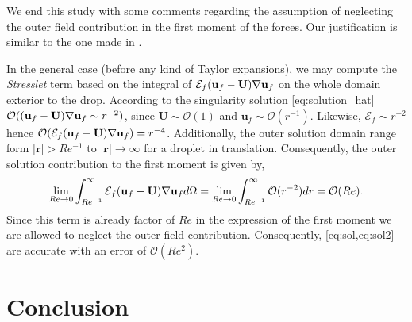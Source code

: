 We end this study with some comments regarding the assumption of neglecting the outer field contribution in the first moment of the forces.
Our justification is similar to the one made in \citet{stone2001inertial,raja2010inertial,jiang2021inertial}.  

In the general case (before any kind of Taylor expansions), we may compute the \textit{Stresslet} term based on the integral of $\mathcal{E}_f (\textbf{u}_f - \textbf{U})\mathbf{\nabla} \textbf{u}_f$ on the whole domain exterior to the drop. 
According to the singularity solution \eqref{eq:solution_hat} $\mathcal{O}((\textbf{u}_f - \textbf{U})\mathbf{\nabla} \textbf{u}_f \sim r^{-2})$, since $\textbf{U} \sim \mathcal{O}(1)$ and $\textbf{u}_f\sim \mathcal{O}(r^{-1})$. 
Likewise, $\mathcal{E}_f \sim r^{-2}$ hence $\mathcal{O}(\mathcal{E}_f (\textbf{u}_f - \textbf{U})\mathbf{\nabla} \textbf{u}_f) = r^{-4}$. 
Additionally, the outer solution domain range form $|\textbf{r}| > Re^{-1}$ to $|\textbf{r}|\to \infty$ for a droplet in translation\citet{proudman1957expansions}.
Consequently, the outer solution contribution to the first moment is given by\citep{stone2001inertial}, 
\begin{equation}
    \lim_{Re \to 0 }
    \int_{Re^{-1}}^\infty
    \mathcal{E}_f (\textbf{u}_f - \textbf{U})\mathbf{\nabla} \textbf{u}_f
    d\Omega
    =
    \lim_{Re \to 0 }
    \int_{Re^{-1}}^\infty
    \mathcal{O}(r^{-2})
    dr
    = \mathcal{O}(Re). 
\end{equation}
Since this term is already factor of $Re$ in the expression of the first moment we are allowed to neglect the outer field contribution. 
Consequently, \ref{eq:sol,eq:sol2} are accurate with an error of $\mathcal{O}(Re^2)$. 

\section{Conclusion}


